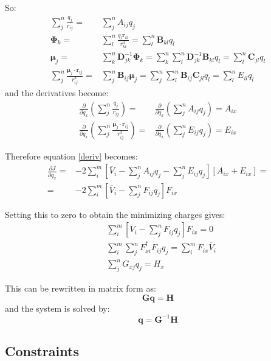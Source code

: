 \documentclass[a4paper]{report}
\newcommand{\bs}{\boldsymbol}
\begin{document}
So:
\begin{align}
\sum_j^n \frac{q_j}{r_{ij}} =& \sum_j^n A_{ij} q_j \\
\bs{\Phi}_k =& \sum_l^n \frac{q_l \bs{r}_{kl}}{r_{kl}^3} = \sum_l^n \bs{B}_{kl} q_l \\
\bs{\mu}_j =& \sum_k^n \bs{D}^{-1}_{jk} \bs{\Phi}_k = \sum_k^n \sum_l^n
\bs{D}^{-1}_{jk} \bs{B}_{kl} q_l = \sum_l^n \bs{C}_{jl} q_l \\
\sum_j^n \frac{\bs{\mu}_j \cdot \bs{r}_{ij}}{r_{ij}^3} =& \sum_j^n \bs{B}_{ij}
\bs{\mu}_j = \sum_j^n \sum_l^n \bs{B}_{ij} \bs{C}_{jl} q_l = \sum_l^n E_{il} q_l
\end{align}
and the derivatives become:
\begin{align}
\frac{\partial}{\partial q_x} \left(\sum_j^n \frac{q_j}{r_{ij}}\right) =&
\frac{\partial}{\partial q_x} \left(\sum_j^n A_{ij} q_j\right) = A_{ix} \\
\frac{\partial}{\partial q_x} \left(\sum_j^n \frac{\bs{\mu}_j \cdot
\bs{r}_{ij}}{r_{ij}^3} \right) =& \frac{\partial}{\partial q_x} \left(\sum_j^n E_{ij}
q_j \right) = E_{ix}
\end{align}

Therefore equation \ref{deriv} becomes:
\begin{align}
\frac{\partial J}{\partial q_x} =& - 2 \sum_i^m \left[ \overline{V}_i - \sum_j^n
A_{ij} q_j - \sum_j^n E_{ij} q_j \right] \left[ A_{ix} + E_{ix} \right] = \nonumber \\
\label{E:A}
=& -2\sum_i^m \left[ \overline{V}_i - \sum_j^n F_{ij} q_j\right] F_{ix}
\end{align}

Setting this to zero to obtain the minimizing charges gives:
\begin{align}
\label{E:B}
&\sum_i^m \left[\overline{V}_i - \sum_j^n F_{ij} q_j \right] F_{ix} = 0 \\
&\sum_i^m \sum_j^n F_{xi}^\dagger F_{ij} q_j = \sum_i^m F_{ix} \overline{V}_i \\
\label{E:C}
&\sum_j^n G_{xj} q_j = H_x
\end{align}

This can be rewritten in matrix form as:
\begin{equation}
\bs{G} \bs{q} = \bs{H}
\end{equation}
and the system is solved by:
\begin{equation}
\bs{q} = \bs{G}^{-1} \bs{H}
\end{equation}

\subsection*{Constraints}
\end{document}
